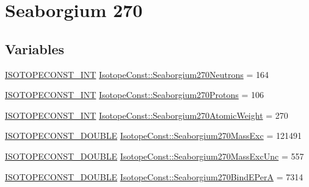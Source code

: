 \hypertarget{group___isotope_const-_seaborgium-_sg270}{}\section{Seaborgium 270}
\label{group___isotope_const-_seaborgium-_sg270}
\subsection*{Variables}
\begin{DoxyCompactItemize}
\item 
\mbox{\hyperlink{group___isotope_const-_macros_ga5f18360b3e99483a35c32d789e62621c}{I\+S\+O\+T\+O\+P\+E\+C\+O\+N\+S\+T\+\_\+\+I\+NT}} \mbox{\hyperlink{group___isotope_const-_seaborgium-_sg270_gad7270b8be6637bb0cdd50d27e4cf931e}{Isotope\+Const\+::\+Seaborgium270\+Neutrons}} = 164
\item 
\mbox{\hyperlink{group___isotope_const-_macros_ga5f18360b3e99483a35c32d789e62621c}{I\+S\+O\+T\+O\+P\+E\+C\+O\+N\+S\+T\+\_\+\+I\+NT}} \mbox{\hyperlink{group___isotope_const-_seaborgium-_sg270_ga0cb8192ddd2fdfea54bfbb26405b44ef}{Isotope\+Const\+::\+Seaborgium270\+Protons}} = 106
\item 
\mbox{\hyperlink{group___isotope_const-_macros_ga5f18360b3e99483a35c32d789e62621c}{I\+S\+O\+T\+O\+P\+E\+C\+O\+N\+S\+T\+\_\+\+I\+NT}} \mbox{\hyperlink{group___isotope_const-_seaborgium-_sg270_ga3476a4c1a63a3c1deaf3ee3d1b893aae}{Isotope\+Const\+::\+Seaborgium270\+Atomic\+Weight}} = 270
\item 
\mbox{\hyperlink{group___isotope_const-_macros_ga8f45a7272ce02c0b4c65c44636ed719a}{I\+S\+O\+T\+O\+P\+E\+C\+O\+N\+S\+T\+\_\+\+D\+O\+U\+B\+LE}} \mbox{\hyperlink{group___isotope_const-_seaborgium-_sg270_gaf67848aa0f027cfb8b16b014e5b3a3af}{Isotope\+Const\+::\+Seaborgium270\+Mass\+Exc}} = 121491
\item 
\mbox{\hyperlink{group___isotope_const-_macros_ga8f45a7272ce02c0b4c65c44636ed719a}{I\+S\+O\+T\+O\+P\+E\+C\+O\+N\+S\+T\+\_\+\+D\+O\+U\+B\+LE}} \mbox{\hyperlink{group___isotope_const-_seaborgium-_sg270_gacc8c35cfd4765e68334b83bcb4ffbbac}{Isotope\+Const\+::\+Seaborgium270\+Mass\+Exc\+Unc}} = 557
\item 
\mbox{\hyperlink{group___isotope_const-_macros_ga8f45a7272ce02c0b4c65c44636ed719a}{I\+S\+O\+T\+O\+P\+E\+C\+O\+N\+S\+T\+\_\+\+D\+O\+U\+B\+LE}} \mbox{\hyperlink{group___isotope_const-_seaborgium-_sg270_ga2dbf1b2c7c2b1cf5c18eea7a226dc446}{Isotope\+Const\+::\+Seaborgium270\+Bind\+E\+PerA}} = 7314
\item 

\end{DoxyCompactItemize}

